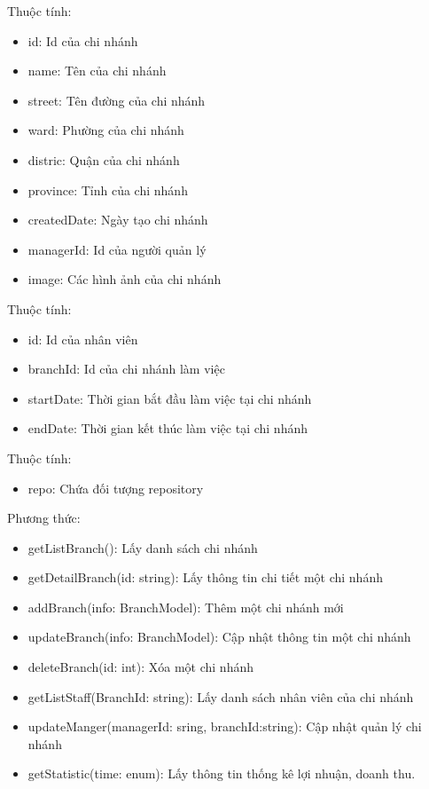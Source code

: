 Thuộc tính:
\begin{itemize}
	\item id: Id của chi nhánh
	\item name: Tên của chi nhánh
	\item street: Tên đường của chi nhánh
	\item ward: Phường của chi nhánh
	\item distric: Quận của chi nhánh
	\item province: Tỉnh của chi nhánh
	\item createdDate: Ngày tạo chi nhánh
	\item managerId: Id của người quản lý
	\item image: Các hình ảnh của chi nhánh
\end{itemize}

Thuộc tính:
\begin{itemize}
	\item id: Id của nhân viên
	\item branchId: Id của chi nhánh làm việc
	\item startDate: Thời gian bắt đầu làm việc tại chi nhánh
	\item endDate: Thời gian kết thúc làm việc tại chi nhánh
\end{itemize}

Thuộc tính:
\begin{itemize}
	\item repo: Chứa đối tượng repository
\end{itemize}
Phương thức:
\begin{itemize}
	\item getListBranch(): Lấy danh sách chi nhánh
	\item getDetailBranch(id: string): Lấy thông tin chi tiết một chi nhánh
	\item addBranch(info: BranchModel): Thêm một chi nhánh mới
	\item updateBranch(info: BranchModel): Cập nhật thông tin một chi nhánh
	\item deleteBranch(id: int): Xóa một chi nhánh
	\item getListStaff(BranchId: string): Lấy danh sách nhân viên của chi nhánh
	\item updateManger(managerId: sring, branchId:string): Cập nhật quản lý chi nhánh
	\item getStatistic(time: enum): Lấy thông tin thống kê lợi nhuận, doanh thu.
\end{itemize}

